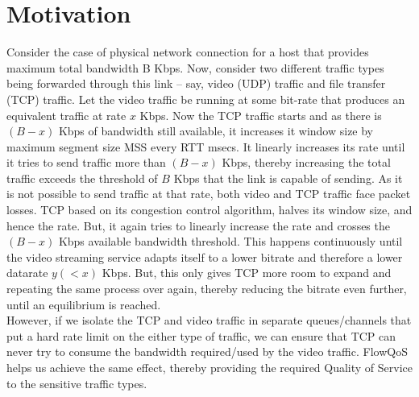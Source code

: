 \section{Motivation}
\label{sec:motivation}

Consider the case of physical network connection for a host that provides maximum total bandwidth B Kbps. Now, consider two different traffic types being forwarded through this link – say, video (UDP) traffic and file transfer (TCP) traffic. Let the video traffic be running at some bit-rate that produces an equivalent traffic at rate $x$ Kbps. Now the TCP traffic starts and as there is $(B-x)$ Kbps of bandwidth still available, it increases it window size by maximum segment size MSS every RTT msecs. It linearly increases its rate until it tries to send traffic more than $(B-x)$ Kbps, thereby increasing the total traffic exceeds the threshold of $B$ Kbps that the link is capable of sending. As it is not possible to send traffic at that rate, both video and TCP traffic face packet losses. TCP based on its congestion control algorithm, halves its window size, and hence the rate. But, it again tries to linearly increase the rate and crosses the $(B-x)$ Kbps available bandwidth threshold. This happens continuously until the video streaming service adapts itself to a lower bitrate and therefore a lower datarate $y (< x)$ Kbps. But, this only gives TCP more room to expand and repeating the same process over again, thereby reducing the bitrate even further, until an equilibrium is reached.\\

However, if we isolate the TCP and video traffic in separate queues/channels that put a hard rate limit on the either type of traffic, we can ensure that TCP can never try to consume the bandwidth required/used by the video traffic. FlowQoS helps us achieve the same effect, thereby providing the required Quality of Service to the sensitive traffic types.\\